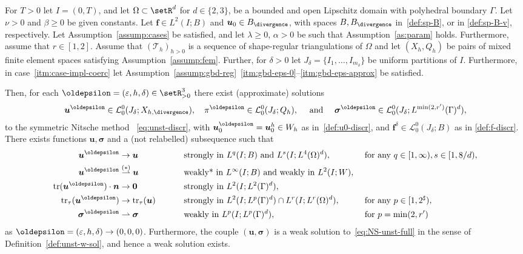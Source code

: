\documentclass[reqno,a4paper]{amsart}
\def\vec#1{\boldsymbol{#1}}
\def\tr{\mathop{\mathrm{tr}}\nolimits}
\def\wconv{\rightharpoonup}
\def\Bh{{W_h}}
\def\Bdiv{{B_{\divergence}}}
\def\b0{\vec{0}}
\def\bf{\vec{f}}
\def\bn{\vec{n}}
\def\bu{\vec{u}}
\def\bsigma{\vec{\sigma}}
\def\tria{\mathcal{T}_h}
\def\discr{\oldepsilon}
\begin{document}
\begin{theorem}\label{thm:main-unsteady}
	For $T>0$ let $I = (0,T)$, and let $\Omega \subset \setR^d$ for $d \in \{2,3\}$, be a bounded and open Lipschitz domain with polyhedral boundary $\Gamma$. 
	Let $\nu>0$ and $\beta \geq  0$ be given constants. 
	Let $ \bf \in L^2(I;B)$ and $ \bu_0 \in \Bdiv$, with spaces $B,\Bdiv$ in~\eqref{def:sp-B}, or in \eqref{def:sp-B-v}, respectively. 
	Let Assumption~\ref{assump:cases} be satisfied, and let $\lambda\geq 0$, $\alpha>0$ be such that Assumption~\ref{as:param} holds. 
	Furthermore, assume that $r \in [1,2]$.
	Assume that $(\tria)_{h>0}$ is a sequence of shape-regular triangulations of $\Omega$ and let $(X_h,Q_h)$ be pairs of mixed finite element spaces satisfying Assumption~\ref{assump:fem}. 
	Further, for $\delta>0$  let $J_{\delta} = \{I_1, \ldots, I_{m_{\delta}}\}$ be uniform partitions of $I$. 
	Furthermore, in case~\ref{itm:case-impl-coerc} let Assumption~\ref{assump:gbd-reg}~\ref{itm:gbd-eps-0}--\ref{itm:gbd-eps-approx} be satisfied.
	
	Then, for each $\oldepsilon = (\varepsilon, h,\delta)\in \setR^{3}_{>0}$ there exist (approximate) solutions
	\begin{align}
		\bu^{\oldepsilon} \in \mathcal{L}^0_0(J_{\delta};X_{h,\divergence}), 
		\quad 
		\pi^{\oldepsilon} \in \mathcal{L}^0_0(J_{\delta};Q_{h}),
		\quad \text{ and } \quad 
		\bsigma^\discr 
		\in \mathcal{L}^0_0(J_{\delta};L^{\min(2,r')}(\Gamma)^d),
	\end{align}
	to the symmetric Nitsche method
	~\eqref{eq:unst-discr}, with $ \bu^\oldepsilon_0 = \bu_0^h \in \Bh$ as in~\eqref{def:u0-discr}, and $\bf^\delta \in \mathcal{L}^0_0(J_{\delta};B)$ as in \eqref{def:f-discr}. 
	There exists functions $\bu, \bsigma$ and a (not relabelled) subsequence such that 
		\begin{alignat*}{5}
			\bu^\oldepsilon 
			&\to  \bu \quad 
			&&\text{ strongly in } L^q(I;B) \text{ and } L^{s}(I;L^4(\Omega)^d), &&\text{ for any } q \in [1,\infty), s \in [1,8/d),
			\\
			\bu^\oldepsilon 
			&\overset{(*)}{\rightharpoonup}  \bu \quad 
			&&\text{ weakly* in } L^\infty(I;B) \text{ and weakly in } L^2(I;W),\\
			\tr (\bu^\oldepsilon) \cdot \bn &\to \b0 \qquad &&\text{ strongly in } L^2(I;L^2(\Gamma)^d), \\
			\tr_\tau (\bu^\oldepsilon) &\to \tr_\tau(\bu) \qquad &&\text{ strongly in } L^{2}(I;L^{p}(\Gamma)^d) \cap L^r(I;L^r(\Omega)^d),  \quad &&\text{ for any  } p \in [1, 2^\sharp),\\
			\bsigma^\discr &\wconv \bsigma \qquad &&\text{ weakly in } L^{p}(I;L^{p}(\Gamma)^d), && \text{ for } 	p = \min(2,r')
		\end{alignat*}	
	as $\oldepsilon = (\varepsilon, h, \delta) \to (0,0,0)$. 
	Furthermore, the couple $(\bu, \bsigma)$ is a weak solution to~\eqref{eq:NS-unst-full} in the sense of Definition~\ref{def:unst-w-sol}, and hence a weak solution exists.  
\end{theorem}
\end{document}
